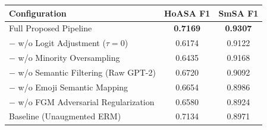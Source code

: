 \begin{tabularx}{\columnwidth}{>{\raggedright\arraybackslash}X c c}
\toprule
\textbf{Configuration} & \textbf{HoASA F1} & \textbf{SmSA F1} \\
\midrule
Full Proposed Pipeline & \textbf{0.7169} & \textbf{0.9307} \\
\quad $-$ w/o Logit Adjustment ($\tau=0$) & 0.6174 & 0.9122 \\
\quad $-$ w/o Minority Oversampling & 0.6435 & 0.9168 \\
\quad $-$ w/o Semantic Filtering (Raw GPT-2) & 0.6720 & 0.9092 \\
\quad $-$ w/o Emoji Semantic Mapping & 0.6654 & 0.8986 \\
\quad $-$ w/o FGM Adversarial Regularization & 0.6580 & 0.8924 \\
Baseline (Unaugmented ERM) & 0.7134 & 0.8971 \\
\bottomrule
\end{tabularx}